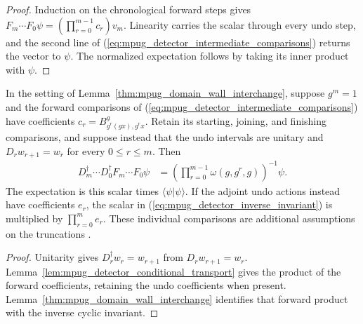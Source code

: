 \begin{proof}\leanok
    Induction on the chronological forward steps gives
    $F_m\cdots F_0\psi=(\prod_{r=0}^{m-1}c_r)v_m$.
    Linearity carries the scalar through every undo step, and the second
    line of (\ref{eq:mpug_detector_intermediate_comparisons}) returns the
    vector to $\psi$. The normalized expectation follows by taking its
    inner product with $\psi$.
\end{proof}

\begin{lemma}
    \label{lem:mpug_detector_domain_wall_transport}
    \leanok
    In the setting of Lemma~\ref{thm:mpug_domain_wall_interchange},
    suppose $g^m=1$ and the forward comparisons of
    (\ref{eq:mpug_detector_intermediate_comparisons}) have coefficients
    $c_r=B^g_{g^r(gx),g^rx}$. Retain its starting, joining, and finishing
    comparisons, and suppose instead that the undo intervals are unitary
    and $D_rw_{r+1}=w_r$ for every $0\leq r\leq m$. Then
    \begin{align}
        D_m^{\dagger}\cdots D_0^{\dagger}F_m\cdots F_0\psi
         & =\left(\prod_{r=0}^{m-1}\omega(g,g^r,g)\right)^{-1}\psi.
        \label{eq:mpug_detector_inverse_invariant}
    \end{align}
    The expectation is this scalar times $\langle\psi|\psi\rangle$.
    If the adjoint undo actions instead have coefficients $e_r$, the
    scalar in (\ref{eq:mpug_detector_inverse_invariant}) is multiplied by
    $\prod_{r=0}^m e_r$. These individual comparisons are additional
    assumptions on the truncations
    \cite{gap:gs24_truncation_detector_endpoint_dependence}.
\end{lemma}

\begin{proof}\leanok
    Unitarity gives $D_r^{\dagger}w_r=w_{r+1}$ from
    $D_rw_{r+1}=w_r$. Lemma~\ref{lem:mpug_detector_conditional_transport}
    gives the product of the forward coefficients, retaining the undo
    coefficients when present. Lemma~\ref{thm:mpug_domain_wall_interchange}
    identifies that forward product with the inverse cyclic invariant.
\end{proof}

